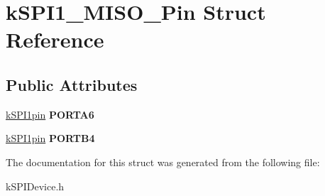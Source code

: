 \hypertarget{structkSPI1__MISO__Pin}{}\section{k\+S\+P\+I1\+\_\+\+M\+I\+S\+O\+\_\+\+Pin Struct Reference}
\label{structkSPI1__MISO__Pin}
\subsection*{Public Attributes}
\begin{DoxyCompactItemize}
\item 
\hyperlink{structkSPI1pin}{k\+S\+P\+I1pin} {\bfseries P\+O\+R\+T\+A6}\hypertarget{structkSPI1__MISO__Pin_a1a63604619ef35ba18b20008d1764161}{}\label{structkSPI1__MISO__Pin_a1a63604619ef35ba18b20008d1764161}

\item 
\hyperlink{structkSPI1pin}{k\+S\+P\+I1pin} {\bfseries P\+O\+R\+T\+B4}\hypertarget{structkSPI1__MISO__Pin_a686d8c72a421ccadb96418c3e616a013}{}\label{structkSPI1__MISO__Pin_a686d8c72a421ccadb96418c3e616a013}

\end{DoxyCompactItemize}


The documentation for this struct was generated from the following file\+:\begin{DoxyCompactItemize}
\item 
k\+S\+P\+I\+Device.\+h\end{DoxyCompactItemize}
